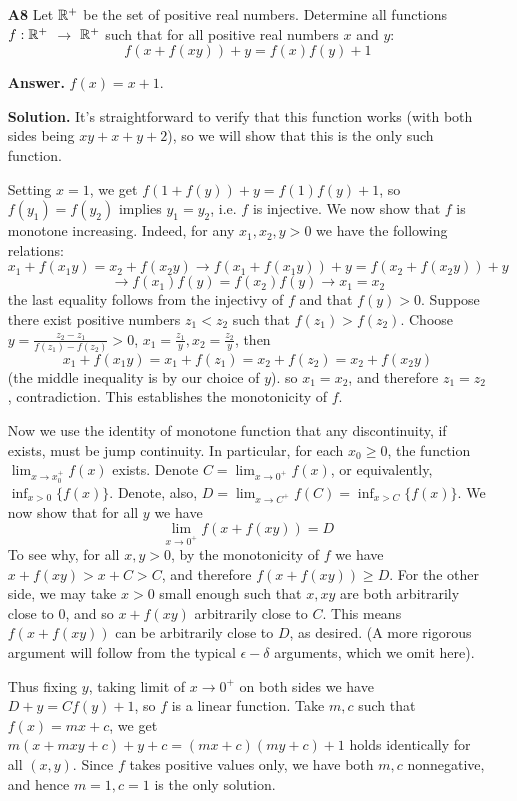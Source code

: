 \documentclass[11pt,a4paper]{article}
\begin{document}
\begin{enumerate}
	\item[\textbf{A8}] 
	Let ${\mathbb R}^+$ be the set of positive real numbers. Determine all functions $f:{\mathbb R}^+$ $\rightarrow$ ${\mathbb R}^+$ such that for all positive real numbers $x$ and $y:$
	$$f(x+f(xy))+y=f(x)f(y)+1$$
	
	\textbf{Answer.} $f(x) = x + 1$. 
	
	\textbf{Solution.} It's straightforward to verify that this function works (with both sides being $xy + x + y + 2$), 
	so we will show that this is the only such function. 
	
	Setting $x=1$, we get $f(1 + f(y)) + y = f(1)f(y) + 1$, so $f(y_1)=f(y_2)$ implies $y_1=y_2$, i.e. $f$ is injective. 
	We now show that $f$ is monotone increasing. 
	Indeed, for any $x_1, x_2, y  > 0$ we have the following relations: 
	\[
	x_1 + f(x_1y) = x_2 + f(x_2y)
	\to f(x_1 + f(x_1y)) + y = f(x_2 + f(x_2y)) + y
	\]\[
	\to f(x_1)f(y)=f(x_2)f(y)
	\to x_1=x_2
	\]
	the last equality follows from the injectivy of $f$ and that $f(y) > 0$. 
	Suppose there exist positive numbers $z_1 < z_2$ such that $f(z_1) > f(z_2)$. 
	Choose $y = \frac{z_2-z_1}{f(z_1)-f(z_2)}> 0$, 
	$x_1 = \frac{z_1}{y}, x_2 = \frac{z_2}{y}$, 
	then 
	\[
	x_1 + f(x_1y)
	=x_1 + f(z_1)
	=x_2 + f(z_2)
	=x_2 + f(x_2y)
	\]
	(the middle inequality is by our choice of $y$). 
	so $x_1=x_2$, and therefore $z_1=z_2$, contradiction. 
	This establishes the monotonicity of $f$. 
	
	Now we use the identity of monotone function that any discontinuity, if exists, must be jump continuity. 
	In particular, for each $x_0\ge 0$, the function $\lim_{x\to x_0^+}f(x)$ exists. 
	Denote $C = \lim_{x\to 0^+} f(x)$, 
	or equivalently, $\inf_{x > 0} \{f(x)\}$. 
	Denote, also, $D = \lim_{x\to C^+} f(C) =  \inf_{x > C} \{f(x)\}$. 
	We now show that for all $y$ we have 
	\[
	\lim_{x\to 0^+} f(x + f(xy)) = D
	\]
	To see why, for all $x, y > 0$, by the monotonicity of $f$ we have $x + f(xy) > x + C > C$, 
	and therefore $f(x + f(xy)) \ge D$. 
	For the other side, we may take $x > 0$ small enough such that $x, xy$ are both arbitrarily close to 0, 
	and so $x + f(xy)$ arbitrarily close to $C$. 
	This means $f(x + f(xy))$ can be arbitrarily close to $D$, as desired. 
	(A more rigorous argument will follow from the typical $\epsilon-\delta$ arguments, which we omit here). 
	
	Thus fixing $y$, taking limit of $x\to 0^+$ on both sides we have $D + y = Cf(y) + 1$, 
	so $f$ is a linear function. 
	Take $m, c$ such that $f(x) = mx + c$, 
	we get $m(x + mxy + c) + y + c = (mx+c)(my+c)+1$ holds identically for all $(x, y)$. 
	Since $f$ takes positive values only, we have both $m, c$ nonnegative, 
	and hence $m=1, c=1$ is the only solution. 
\end{enumerate}
\end{document}
